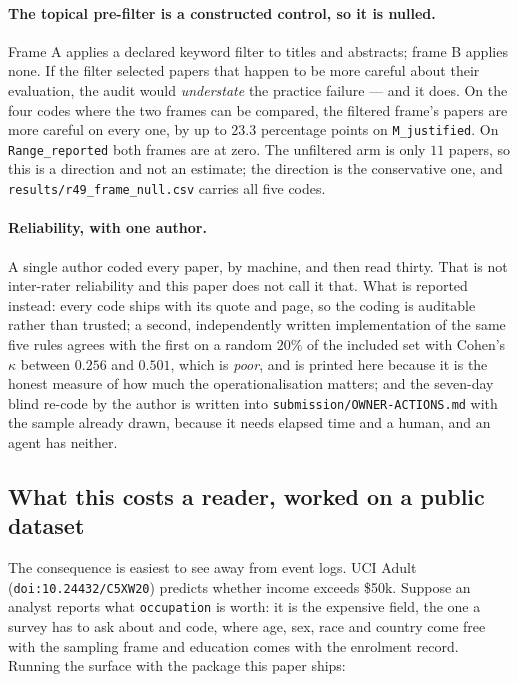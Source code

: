 \documentclass[preprint,12pt]{elsarticle}
\begin{document}
\paragraph{The topical pre-filter is a constructed control, so it is
nulled.} Frame A applies a declared keyword filter to titles and abstracts;
frame B applies none. If the filter selected papers that happen to be more
careful about their evaluation, the audit would \emph{understate} the practice
failure --- and it does. On the four codes where the two frames can be
compared, the filtered frame's papers are more careful on every one, by up to
$23.3$ percentage points on \texttt{M\_justified}. On
\texttt{Range\_reported} both frames are at zero. The unfiltered arm is only
$11$ papers, so this is a direction and not an estimate; the direction is the
conservative one, and \texttt{results/r49\_frame\_null.csv} carries all five
codes.

\paragraph{Reliability, with one author.} A single author coded every paper,
by machine, and then read thirty. That is not inter-rater reliability and this
paper does not call it that. What is reported instead: every code ships with
its quote and page, so the coding is auditable rather than trusted; a second,
independently written implementation of the same five rules agrees with the
first on a random $20\%$ of the included set with Cohen's $\kappa$ between
$0.256$ and $0.501$, which is \emph{poor}, and is printed here because it is
the honest measure of how much the operationalisation matters; and the
seven-day blind re-code by the author is written into
\texttt{submission/OWNER-ACTIONS.md} with the sample already drawn, because it
needs elapsed time and a human, and an agent has neither.

\subsection{What this costs a reader, worked on a public dataset}
\label{sec:audit:worked}

The consequence is easiest to see away from event logs. UCI Adult
(\texttt{doi:10.24432/C5XW20}) predicts whether income exceeds \$50k. Suppose
an analyst reports what \texttt{occupation} is worth: it is the expensive
field, the one a survey has to ask about and code, where age, sex, race and
country come free with the sampling frame and education comes with the
enrolment record. Running the surface with the package this paper ships:
\end{document}
